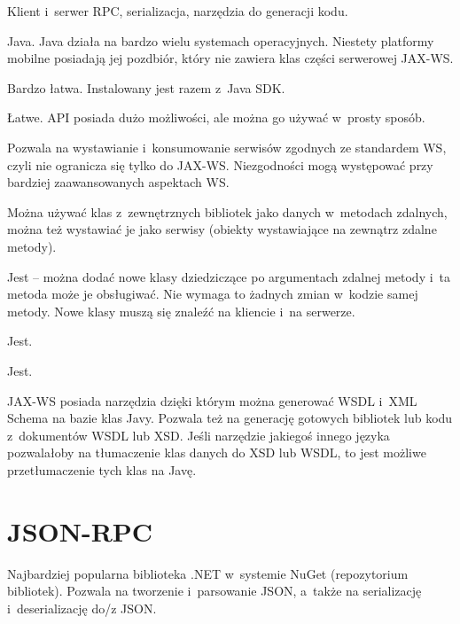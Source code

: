 \begin{description}
Klient i~serwer RPC, serializacja, narzędzia do generacji kodu.

Java. Java działa na bardzo wielu systemach operacyjnych. Niestety platformy mobilne posiadają jej pozdbiór, który nie zawiera klas części serwerowej JAX-WS.

Bardzo łatwa. Instalowany jest razem z~Java SDK.

Łatwe. API posiada dużo możliwości, ale można go używać w~prosty sposób.

Pozwala na wystawianie i~konsumowanie serwisów zgodnych ze standardem WS, czyli nie ogranicza się tylko do JAX-WS.
Niezgodności mogą występować przy bardziej zaawansowanych aspektach WS.

Można używać klas z~zewnętrznych bibliotek jako danych w~metodach zdalnych, można też wystawiać je jako serwisy (obiekty wystawiające na zewnątrz zdalne metody).

Jest -- można dodać nowe klasy dziedziczące po argumentach zdalnej metody i~ta metoda może je obsługiwać. Nie wymaga to żadnych zmian w~kodzie samej metody. Nowe klasy muszą się znaleźć na kliencie i~na serwerze.

Jest.

Jest.

JAX-WS posiada narzędzia dzięki którym można generować WSDL i~XML Schema na bazie klas Javy.
Pozwala też na generację gotowych bibliotek lub kodu z~dokumentów WSDL lub XSD.
Jeśli narzędzie jakiegoś innego języka pozwalałoby na tłumaczenie klas danych do XSD lub WSDL, to jest możliwe przetłumaczenie tych klas na Javę.
\end{description}



\section{JSON-RPC}
Najbardziej popularna biblioteka .NET w~systemie NuGet (repozytorium bibliotek).
Pozwala na tworzenie i~parsowanie JSON, a~także na serializację i~deserializację do/z JSON.
 
